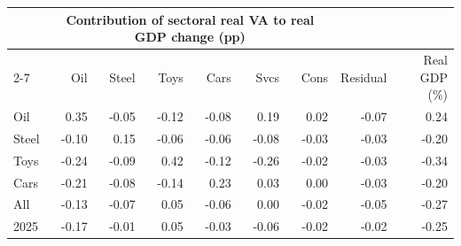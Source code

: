 \begin{tabular}{lrrrrrrrr}
\toprule
 & \multicolumn{6}{c}{Contribution of sectoral real VA to real GDP change (pp)} & & \\
\cmidrule(lr){2-7}
 & Oil & Steel & Toys & Cars & Svcs & Cons & Residual & Real GDP (\%) \\
\midrule
Oil & 0.35 & -0.05 & -0.12 & -0.08 & 0.19 & 0.02 & -0.07 & 0.24 \\
Steel & -0.10 & 0.15 & -0.06 & -0.06 & -0.08 & -0.03 & -0.03 & -0.20 \\
Toys & -0.24 & -0.09 & 0.42 & -0.12 & -0.26 & -0.02 & -0.03 & -0.34 \\
Cars & -0.21 & -0.08 & -0.14 & 0.23 & 0.03 & 0.00 & -0.03 & -0.20 \\
All & -0.13 & -0.07 & 0.05 & -0.06 & 0.00 & -0.02 & -0.05 & -0.27 \\
2025 & -0.17 & -0.01 & 0.05 & -0.03 & -0.06 & -0.02 & -0.02 & -0.25 \\
\bottomrule
\end{tabular}
